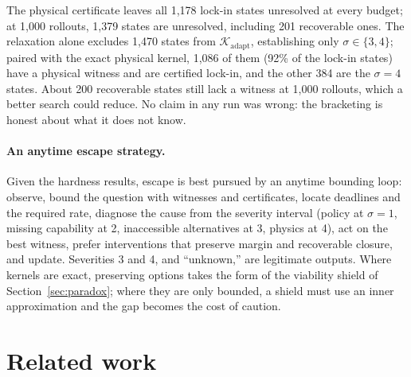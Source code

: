 \documentclass[11pt]{article}
\theoremstyle{plain}
\theoremstyle{definition}
\newcommand{\K}{\mathcal{K}}
\newcommand{\adapt}{\mathrm{adapt}}
\begin{document}
The physical certificate leaves all 1,178 lock-in states unresolved at every budget; at 1,000 rollouts, 1,379 states are unresolved, including 201 recoverable ones. The relaxation alone excludes 1,470 states from $\K_\adapt$, establishing only $\sigma\in\{3,4\}$; paired with the exact physical kernel, 1,086 of them (92\% of the lock-in states) have a physical witness and are certified lock-in, and the other 384 are the $\sigma=4$ states. About 200 recoverable states still lack a witness at 1,000 rollouts, which a better search could reduce. No claim in any run was wrong: the bracketing is honest about what it does not know.

\paragraph{An anytime escape strategy.} Given the hardness results, escape is best pursued by an anytime bounding loop: observe, bound the question with witnesses and certificates, locate deadlines and the required rate, diagnose the cause from the severity interval (policy at $\sigma=1$, missing capability at 2, inaccessible alternatives at 3, physics at 4), act on the best witness, prefer interventions that preserve margin and recoverable closure, and update. Severities 3 and 4, and ``unknown,'' are legitimate outputs. Where kernels are exact, preserving options takes the form of the viability shield of Section~\ref{sec:paradox}; where they are only bounded, a shield must use an inner approximation and the gap becomes the cost of caution.

\section{Related work}
\label{sec:related}
\end{document}
